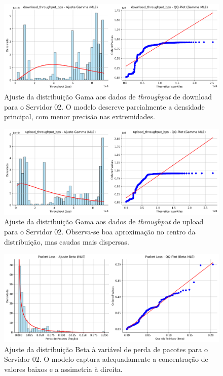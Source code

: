 \documentclass{article}
\begin{document}
\begin{figure}[htp]
	\includegraphics[width=\textwidth]{../figures/mle/download_throughput_bps_ajuste_gamma_server02.png}
	\caption{Ajuste da distribuição Gama aos dados de \textit{throughput} de download para o Servidor 02. O modelo descreve parcialmente a densidade principal, com menor precisão nas extremidades.}
	\label{fig:download_throughput_bps_ajuste_gamma_server02}
\end{figure}

\begin{figure}[htp]
	\includegraphics[width=\textwidth]{../figures/mle/upload_throughput_bps_ajuste_gamma_server02.png}
	\caption{Ajuste da distribuição Gama aos dados de \textit{throughput} de upload para o Servidor 02. Observa-se boa aproximação no centro da distribuição, mas caudas mais dispersas.}
	\label{fig:upload_throughput_bps_ajuste_gamma_server02}
\end{figure}

\begin{figure}[htp]
	\includegraphics[width=\textwidth]{../figures/mle/packet_loss_ajuste_beta_serve02.png}
	\caption{Ajuste da distribuição Beta à variável de perda de pacotes para o Servidor 02. O modelo captura adequadamente a concentração de valores baixos e a assimetria à direita.}
	\label{fig:packet_loss_ajuste_beta_serve02}
\end{figure}
\end{document}
